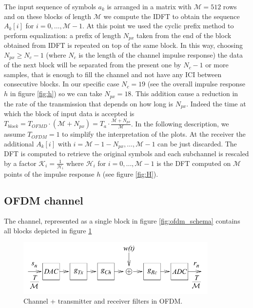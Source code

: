 \documentclass[a4paper,11.5pt]{article}
\begin{document}
The input sequence of symbols $a_k$ is arranged in a matrix with $\mathcal{M}=512$ rows and on these blocks of length $\mathcal{M}$ we compute the IDFT to obtain the sequence $A_k[i]$ for $i=0,\dots , \mathcal{M}-1$. At this point we used the cyclic prefix method to perform equalization: a prefix of length $N_{px}$ taken from the end of the block obtained from IDFT is repeated on top of the same block. In this way, choosing $N_{px}\geq N_c-1$ (where $N_c$ is the length of the channel impulse response) the data of the next block will be separated from the present one by $N_c-1$ or more samples, that is enough to fill the channel and not have any ICI between consecutive blocks. In our specific case $N_c=19$ (see the overall impulse response $h$ in figure \ref{fig:h}) so we can take $N_{px}=18$.
This addition cause a reduction in the rate of the transmission that depends on how long is $N_{px}$. Indeed the time at which the block of input data is accepted is $T_{block} = T_{OFMD} \cdot (\mathcal{M} + N_{px}) = T_a \cdot \frac{\mathcal{M} + N_{px}}{\mathcal{M}}$. In the following description, we assume $T_{OFDM} = 1$ to simplify the interpretation of the plots.
 At the receiver the additional $A_k[i]$ with $i=\mathcal{M}-1-N_{px},\dots ,\mathcal{M}-1$ can be just discarded. The DFT is computed to retrieve the original symbols and each subchannel is rescaled by a factor $\mathcal{K}_i = \frac{1}{\mathcal{H}_i}$ where $\mathcal{H}_i$ for $i=0, \dots, \mathcal{M}-1$ is the DFT  computed on $\mathcal{M}$ points of the impulse response $h$ (see figure \ref{fig:H}).

\subsection*{OFDM channel}

The channel, represented as a single block in figure \ref{fig:ofdm_schema} contains all blocks depicted in figure \ref{fig:ofdm_channel_schema}

\begin{figure}[H]
	\begin{center}   
		\includegraphics[width=10cm]{figs/OFDM_channel_schema.png} 
		\caption{Channel + transmitter and receiver filters in OFDM.}
		\label{fig:ofdm_channel_schema}
	\end{center}
\end{figure}
\end{document}
